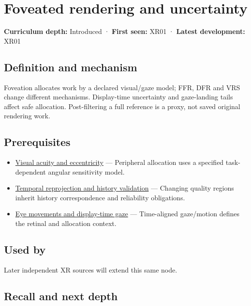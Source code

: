 \hypertarget{appendix-5878b813b732}{}\label{referencestart:appendix-5878b813b732}
\section{Foveated rendering and uncertainty}\label{appendix-5878b813b732-foveated-rendering-and-uncertainty}

\textbf{Curriculum depth:} Introduced · \textbf{First seen:} XR01 · \textbf{Latest development:} XR01

\subsection{Definition and mechanism}\label{appendix-5878b813b732-definition-and-mechanism}

Foveation allocates work by a declared visual/gaze model; FFR, DFR and VRS change different mechanisms. Display-time uncertainty and gaze-landing tails affect safe allocation. Post-filtering a full reference is a proxy, not saved original rendering work.

\subsection{Prerequisites}\label{appendix-5878b813b732-prerequisites}

\begin{itemize}
\tightlist
\item
  \hyperref[appendix-b491fc48c54b]{Visual acuity and eccentricity} --- Peripheral allocation uses a specified task-dependent angular sensitivity model.
\item
  \hyperref[appendix-0727340a4428]{Temporal reprojection and history validation} --- Changing quality regions inherit history correspondence and reliability obligations.
\item
  \hyperref[appendix-a6f2c4fe1996]{Eye movements and display-time gaze} --- Time-aligned gaze/motion defines the retinal and allocation context.
\end{itemize}

\subsection{Used by}\label{appendix-5878b813b732-used-by}

Later independent XR sources will extend this same node.

\subsection{Recall and next depth}\label{appendix-5878b813b732-recall-and-next-depth}


